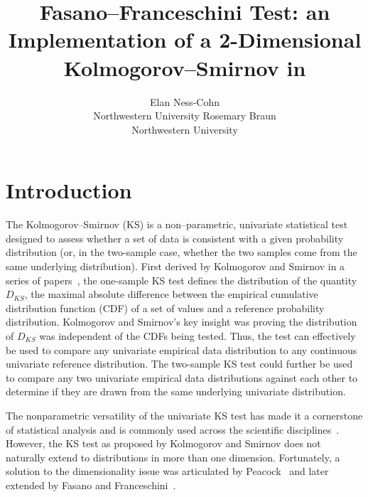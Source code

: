 \documentclass[codesnippet]{jss}
\author{Elan Ness-Cohn\\Northwestern University
   \And Rosemary Braun\\Northwestern University}
\title{Fasano--Franceschini Test: an Implementation of a 2-Dimensional Kolmogorov--Smirnov in \proglang{R}}
\begin{document}


\section[Introduction]{Introduction} \label{sec:intro}

The Kolmogorov--Smirnov (KS) is a non--parametric, univariate
statistical test designed to assess whether a set of data is
consistent with a given probability distribution (or, in the two-sample
case,  whether the two
samples come from the same underlying distribution). First derived by
Kolmogorov and Smirnov in a series of
papers~\citep{Kolmogorov1933,Kolmogorov1933a,Smirnov1936,Smirnov1937,Smirnov1939,Smirnov1944,Smirnov1948},
the one-sample KS test defines the distribution of the quantity
$D_{KS}$, the maximal absolute difference between the empirical
cumulative distribution function (CDF) of a set of values and a
reference probability distribution. Kolmogorov and Smirnov's key
insight was proving the distribution of $D_{KS}$ was independent of
the CDFs being tested. Thus, the test can effectively be used to
compare any univariate empirical data distribution to any continuous
univariate reference distribution. The two-sample KS test could further
be used to compare any two univariate empirical data distributions
against each other to determine if they are drawn from the same
underlying univariate distribution.

The nonparametric versatility of the univariate KS test has made it a cornerstone of
statistical analysis and is commonly used across the scientific
disciplines~\citep{Atasoy2017,Chiang2018,Hahne2018,Hargreaves2020,Wong2020,Kaczanowska2021}.
However, the KS test as proposed by Kolmogorov
and Smirnov does not naturally extend to distributions in more
than one dimension. Fortunately, a solution to the dimensionality
issue was articulated by Peacock~\citep{Peacock1983} and later
extended by Fasano and Franceschini~\citep{Fasano1987}.
\end{document}

